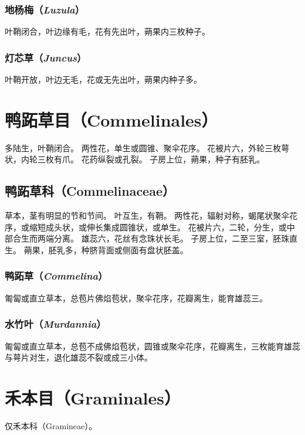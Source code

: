 \documentclass[11pt]{article}
\begin{document}
\begin{sloppypar}
\subsubsection{地杨梅（\textit{Luzula}）}
叶鞘闭合，叶边缘有毛，花有先出叶，蒴果内三枚种子。

\subsubsection{灯芯草（\textit{Juncus}）}
叶鞘开放，叶边无毛，花或无先出叶，蒴果内种子多。

\section{鸭跖草目（Commelinales）}
多陆生，叶鞘闭合。
两性花，单生或圆锥、聚伞花序。
花被片六，外轮三枚萼状，内轮三枚有爪。
花药纵裂或孔裂。
子房上位，蒴果，种子有胚乳。

\subsection{鸭跖草科（Commelinaceae）}
草本，茎有明显的节和节间。
叶互生，有鞘。
两性花，辐射对称，蝎尾状聚伞花序，或缩短成头状，或伸长集成圆锥状，或单生。
花被片六，二轮，分生，或中部合生而两端分离。
雄蕊六，花丝有念珠状长毛。
子房上位，二至三室，胚珠直生。
蒴果，胚乳多，种脐背面或侧面有盘状胚盖。

\subsubsection{鸭跖草（\textit{Commelina}）}
匍匐或直立草本，总苞片佛焰苞状，聚伞花序，花瓣离生，能育雄蕊三。

\subsubsection{水竹叶（\textit{Murdannia}）}
匍匐或直立草本，总苞不成佛焰苞状，圆锥或聚伞花序，花瓣离生，三枚能育雄蕊与萼片对生，退化雄蕊不裂或成三小体。

\section{禾本目（Graminales）}
仅禾本科（Gramineae）。


\end{sloppypar}
\end{document}
